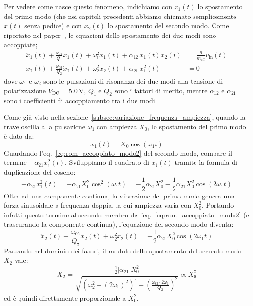 \documentclass[11pt,a4paper]{article}
\begin{document}
\vspace{0.3cm}
\noindent Per vedere come nasce questo fenomeno, indichiamo con $x_1(t)$ lo spostamento del primo modo (che nei capitoli precedenti abbiamo chiamato semplicemente $x(t)$ senza pedice) e con $x_2(t)$ lo spostamento del secondo modo. Come riportato nel paper~\cite{frangi2023}, le equazioni dello spostamento dei due modi sono accoppiate;
\begin{align}
    \label{eq:rom_accoppiato_modo1}
    \ddot{x}_1(t) + \frac{\omega_{01}}{Q_1}\dot{x}_1(t) + \omega_1^2 x_1(t) + \alpha_{12} \, x_1(t) x_2(t) &= \frac{\eta}{m_{\text{eff}}} v_{\text{in}}(t) \\[4pt]
    \label{eq:rom_accoppiato_modo2}
    \ddot{x}_2(t) + \frac{\omega_{02}}{Q_2}\dot{x}_2(t) + \omega_2^2 x_2(t) + \alpha_{21} \, x_1^2(t) &= 0
\end{align}
dove $\omega_1$ e $\omega_2$ sono le pulsazioni di risonanza dei due modi alla tensione di polarizzazione $V_{\text{DC}} = \SI{5.0}{\volt}$, $Q_1$ e $Q_2$ sono i fattori di merito, mentre $\alpha_{12}$ e $\alpha_{21}$ sono i coefficienti di accoppiamento tra i due modi.

\vspace{0.3cm}
\noindent Come già visto nella sezione~\ref{subsec:variazione_frequenza_ampiezza}, quando la trave oscilla alla pulsazione $\omega_1$ con ampiezza $X_0$, lo spostamento del primo modo è dato da:
\begin{equation}
    x_1(t) = X_0 \cos(\omega_1 t)
\end{equation}
Guardando l'eq.~\eqref{eq:rom_accoppiato_modo2} del secondo modo, compare il termine $-\alpha_{21} x_1^2(t)$. Sviluppiamo il quadrato di $x_1(t)$ tramite la formula di duplicazione del coseno:
\begin{equation}
    -\alpha_{21} x_1^2(t) = -\alpha_{21} X_0^2 \cos^2(\omega_1 t) = -\frac{1}{2} \alpha_{21} X_0^2 - \frac{1}{2} \alpha_{21} X_0^2 \cos(2\omega_1 t)
\end{equation}
Oltre ad una componente continua, la vibrazione del primo modo genera una forza sinusoidale a frequenza doppia, la cui ampiezza varia con $X_0^2$. Portando infatti questo termine al secondo membro dell'eq.~\eqref{eq:rom_accoppiato_modo2} (e trascurando la componente continua), l'equazione del secondo modo diventa:
\begin{equation}
    \ddot{x}_2(t) + \frac{\omega_{02}}{Q_2}\dot{x}_2(t) + \omega_2^2 x_2(t) = -\frac{1}{2} \alpha_{21} X_0^2 \cos(2\omega_1 t)
\end{equation}
Passando nel dominio dei fasori, il modulo dello spostamento del secondo modo $X_2$ vale:
\begin{equation}
    \label{eq:modulo_X2}
    X_2 = \frac{\frac{1}{2}|\alpha_{21}| X_0^2}{\sqrt{\left(\omega_2^2 - (2\omega_1)^2\right)^2 + \left(\frac{\omega_{02} \cdot 2\omega_1}{Q_2}\right)^2}} \propto X_0^2
\end{equation}
ed è quindi direttamente proporzionale a $X_0^2$.
\end{document}
